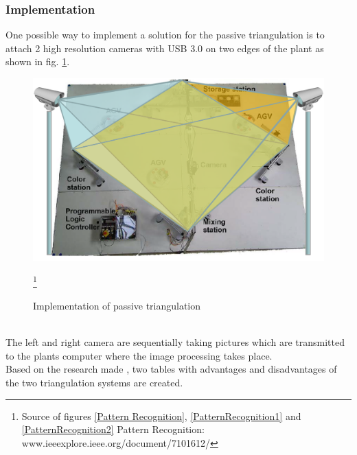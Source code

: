 \subsubsection*{Implementation} 
One possible way to implement a solution for the passive triangulation is to attach 2 high resolution cameras with USB 3.0 on two edges of the plant as shown in fig. \ref{ativeTriangulationimplementation}.\\
\begin{figure}[!htbp]
	\centering
	\includegraphics[width = 16cm]{Pictures/triangulationimplementatio}
	\caption{Implementation of passive triangulation}
	\label{ativeTriangulationimplementation}
	\footnote{Source of figures \ref{Pattern Recognition}, \ref{PatternRecognition1} and \ref{PatternRecognition2}  Pattern Recognition: www.ieeexplore.ieee.org/document/7101612/} 
\end{figure}\\%
The left and right camera are sequentially taking pictures which are transmitted to the plants computer where the image processing takes place.\\ 
\pagebreak
Based on the research made , two tables with advantages and disadvantages of the two triangulation systems are created.
